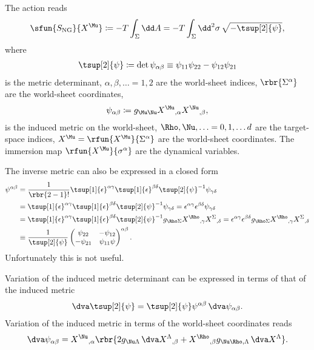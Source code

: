 \documentclass[a4paper,11pt]{article}
\begin{document}
The action reads \cite{Nambu1970a,Goto1971}
\begin{align}
\sfun{S_{\text{NG}}}{X^{\Mu}} \coloneqq -T \int_{\Sigma} \dd A = 
-T \int_{\Sigma} \dd^2 \sigma\,\sqrt{-\tsup[2]{\psi}},
\end{align}
where
\begin{align}
\tsup[2]{\psi} \coloneqq \det \psi_{\alpha\beta} \equiv
\psi_{11}\psi_{22} - \psi_{12}\psi_{21}
\end{align}
is the metric determinant, $\alpha, \beta, \ldots = 1, 2$ are the world-sheet 
indices, $\rbr{\Sigma^\alpha}$ are the world-sheet coordinates, 
\begin{align}
\psi_{\alpha\beta} \coloneqq g_{\Mu\Nu} 
X^{\Mu}{}_{,\alpha} X^{\Nu}{}_{,\beta},
\end{align}
is the induced metric on the world-sheet, $\Rho, \Nu, \ldots = 0, 1, \ldots d$ 
are the target-space indices, $X^{\Mu} = \rfun{X^{\Mu}}{\Sigma^{\alpha}}$ are 
the world-sheet \cite{Susskind1970} coordinates. The immersion map 
$\rfun{X^{\Mu}}{\sigma^\alpha}$ are the dynamical variables.

The inverse metric can also be expressed in a closed form
\begin{align}
\psi^{\alpha\beta} &= \frac{1}{\rbr{2-1}!} 
	\tsup[1]{\epsilon}^{\alpha\gamma} \tsup[1]{\epsilon}^{\beta\delta} 
	\tsup[2]{\psi}^{-1} \psi_{\gamma\delta}
\nonumber \\
&=
	\tsup[1]{\epsilon}^{\alpha\gamma} \tsup[1]{\epsilon}^{\beta\delta} 
	\tsup[2]{\psi}^{-1} \psi_{\gamma\delta} =
	\epsilon^{\alpha\gamma} \epsilon^{\beta\delta} \psi_{\gamma\delta}
\\
&=
\tsup[1]{\epsilon}^{\alpha\gamma} \tsup[1]{\epsilon}^{\beta\delta} 
	\tsup[2]{\psi}^{-1} g_{\Rho\Sigma} 
	X^{\Rho}{}_{,\gamma} X^{\Sigma}{}_{,\delta} =
\epsilon^{\alpha\gamma} \epsilon^{\beta\delta} g_{\Rho\Sigma} 
	X^{\Rho}{}_{,\gamma} X^{\Sigma}{}_{,\delta}
\\
&\equiv \frac{1}{\tsup[2]{\psi}}
\begin{pmatrix}
\psi_{22} & -\psi_{12} \\ -\psi_{21} & \psi_{11}\psi
\end{pmatrix}^{\alpha\beta}.
\end{align}
Unfortunately this is not useful.

Variation of the induced metric determinant can be expressed in terms of that 
of the induced metric
\begin{align}
\dva \tsup[2]{\psi} = \tsup[2]{\psi} \psi^{\alpha\beta}\,\dva 
	\psi_{\alpha\beta}.
\end{align}
Variation of the induced metric in terms of the world-sheet coordinates reads 
\begin{align}
\dva \psi_{\alpha\beta} = X^{\Nu}{}_{,\alpha} \rbr{
	2 g_{\Nu\Lambda}\, \dva X^{\Lambda}{}_{,\beta} + 
	X^{\Rho}{}_{,\beta} g_{\Nu\Rho,\Lambda}\, \dva X^{\Lambda}}.
\end{align}
\end{document}
